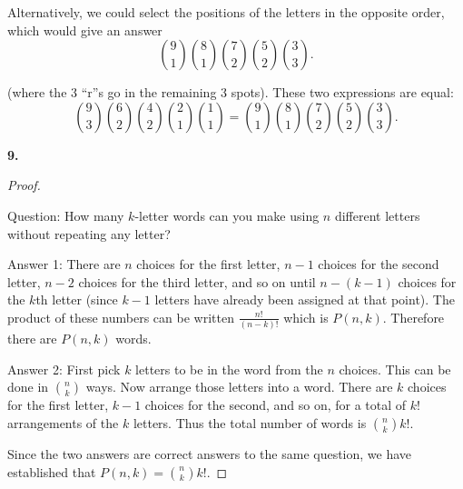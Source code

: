 \documentclass[10pt,]{book}
\theoremstyle{plain}
\theoremstyle{definition}
\theoremstyle{definition}
\theoremstyle{definition}
\numberwithin{equation}{section}
\begin{document}
          Alternatively, we could select the positions of the letters in the opposite order, which would give an answer
          \begin{equation*}
            {9 \choose 1}{8\choose 1}{7 \choose 2}{5\choose 2}{3\choose 3}.
          \end{equation*}
\par

          (where the 3 ``r''s go in the remaining 3 spots). These two expressions are equal:
          \begin{equation*}
            {9 \choose 3}{6 \choose 2}{4 \choose 2}{2\choose 1}{1\choose 1} = {9 \choose 1}{8\choose 1}{7 \choose 2}{5\choose 2}{3\choose 3}.
          \end{equation*}
\par\smallskip
\noindent\textbf{9.}\quad{}\begin{proof}\hypertarget{proof-11}{}

            Question: How many \(k\)-letter words can you make using \(n\) different letters without repeating any letter?
\par

            Answer 1: There are \(n\) choices for the first letter, \(n-1\) choices for the second letter, \(n-2\) choices for the third letter, and so on until \(n - (k-1)\) choices for the \(k\)th letter (since \(k-1\) letters have already been assigned at that point). The product of these numbers can be written \(\frac{n!}{(n-k)!}\) which is \(P(n,k)\).  Therefore there are \(P(n,k)\) words.
\par

            Answer 2: First pick \(k\) letters to be in the word from the \(n\) choices. This can be done in \({n \choose k}\) ways. Now arrange those letters into a word. There are \(k\) choices for the first letter, \(k-1\) choices for the second, and so on, for a total of \(k!\) arrangements of the \(k\) letters. Thus the total number of words is \({n \choose k}k!\).
\par

            Since the two answers are correct answers to the same question, we have established that \(P(n,k) = {n \choose k}k!\).
\end{proof}
\par\smallskip
\end{document}
